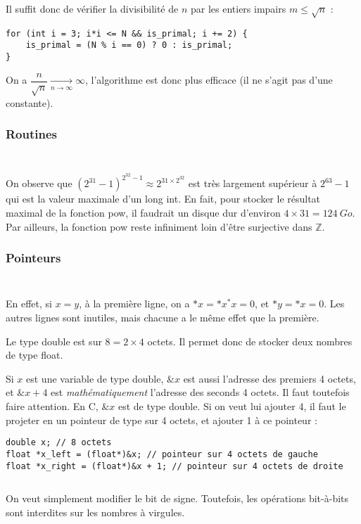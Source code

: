 \documentclass[../main.tex]{subfiles}
\begin{document}
Il suffit donc de vérifier la divisibilité de $n$ par les entiers impairs $m\leq{\sqrt{n}}$ :
\begin{verbatim}
for (int i = 3; i*i <= N && is_primal; i += 2) {
	is_primal = (N % i == 0) ? 0 : is_primal;
}
\end{verbatim}
On a $\dfrac{n}{\sqrt{n}}\underset{n\rightarrow{\infty}}{\rightarrow}\infty$, l'algorithme est donc plus efficace (il ne s'agit pas d'une constante).
\subsubsection{Routines}
\inputminted{c}{solutions/suite_fibonacci_2.c}
\inputminted{c}{solutions/int_pow.c}
On observe que $(2^{31}-1)^{2^{32}-1}\approx{2^{31\times{2^{32}}}}$ est très largement supérieur à $2^{63} - 1$ qui est la valeur maximale d'un \textsf{long int}. En fait, pour stocker le résultat maximal de la fonction \textsf{pow}, il faudrait un disque dur d'environ $4\times{31} = 124\ Go$. Par ailleurs, la fonction \textsf{pow} reste infiniment loin d'être surjective dans $\mathbb{Z}$.
\subsubsection{Pointeurs}
\inputminted{c}{solutions/become_bot.c}
\inputminted{c}{solutions/inter_no_side_effect_3.c}
En effet, si $x = y$, à la première ligne, on a $*x = *x ^ *x = 0$, et $*y = *x = 0$. Les autres lignes sont inutiles, mais chacune a le même effet que la première.

Le type \textsf{double} est sur $8 = 2\times{4}$ octets. Il permet donc de stocker deux nombres de type \textsf{float}.

Si $x$ est une variable de type \textsf{double}, $\&x$ est aussi l'adresse des premiers 4 octets, et $\&x + 4$ est \textit{mathématiquement} l'adresse des seconds 4 octets. Il faut toutefois faire attention. En C, $\&x$ est de type \textsf{double}. Si on veut lui ajouter 4, il faut le projeter en un pointeur de type sur 4 octets, et ajouter 1 à ce pointeur :
\begin{verbatim}
double x; // 8 octets
float *x_left = (float*)&x; // pointeur sur 4 octets de gauche
float *x_right = (float*)&x + 1; // pointeur sur 4 octets de droite
\end{verbatim}
\inputminted{c}{solutions/manhattan_dist.c}
On veut simplement modifier le bit de signe. Toutefois, les opérations bit-à-bits sont interdites sur les nombres à virgules.
\end{document}
